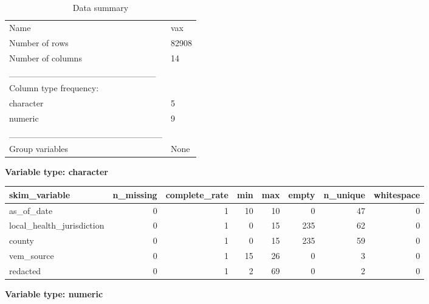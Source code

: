 \documentclass[
]{article}
\begin{document}
\begin{longtable}[]{@{}ll@{}}
\caption{Data summary}\tabularnewline
\toprule
\endhead
Name & vax \\
Number of rows & 82908 \\
Number of columns & 14 \\
\_\_\_\_\_\_\_\_\_\_\_\_\_\_\_\_\_\_\_\_\_\_\_ & \\
Column type frequency: & \\
character & 5 \\
numeric & 9 \\
\_\_\_\_\_\_\_\_\_\_\_\_\_\_\_\_\_\_\_\_\_\_\_\_ & \\
Group variables & None \\
\bottomrule
\end{longtable}

\textbf{Variable type: character}

\begin{longtable}[]{@{}lrrrrrrr@{}}
\toprule
skim\_variable & n\_missing & complete\_rate & min & max & empty &
n\_unique & whitespace \\
\midrule
\endhead
as\_of\_date & 0 & 1 & 10 & 10 & 0 & 47 & 0 \\
local\_health\_jurisdiction & 0 & 1 & 0 & 15 & 235 & 62 & 0 \\
county & 0 & 1 & 0 & 15 & 235 & 59 & 0 \\
vem\_source & 0 & 1 & 15 & 26 & 0 & 3 & 0 \\
redacted & 0 & 1 & 2 & 69 & 0 & 2 & 0 \\
\bottomrule
\end{longtable}

\textbf{Variable type: numeric}
\end{document}
